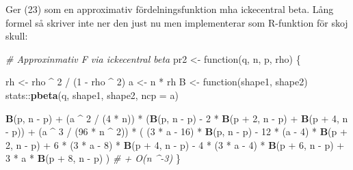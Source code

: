 \documentclass[]{article}
\newenvironment{Shaded}{\begin{snugshade}}{\end{snugshade}}
\newcommand{\KeywordTok}[1]{\textcolor[rgb]{0.13,0.29,0.53}{\textbf{{#1}}}}
\newcommand{\DataTypeTok}[1]{\textcolor[rgb]{0.13,0.29,0.53}{{#1}}}
\newcommand{\DecValTok}[1]{\textcolor[rgb]{0.00,0.00,0.81}{{#1}}}
\newcommand{\StringTok}[1]{\textcolor[rgb]{0.31,0.60,0.02}{{#1}}}
\newcommand{\CommentTok}[1]{\textcolor[rgb]{0.56,0.35,0.01}{\textit{{#1}}}}
\newcommand{\NormalTok}[1]{{#1}}
\begin{document}
Ger (23) som en approximativ fördelningsfunktion mha ickecentral beta.
Lång formel så skriver inte ner den just nu men implementerar som
R-funktion för skoj skull:

\begin{Shaded}
\begin{Highlighting}[]
\CommentTok{# Approxinmativ F via ickecentral beta}
\NormalTok{pr2 <-}\StringTok{ }\NormalTok{function(q, n, p, rho) \{}
  
  \NormalTok{rh <-}\StringTok{ }\NormalTok{rho ^}\StringTok{ }\DecValTok{2} \NormalTok{/}\StringTok{ }\NormalTok{(}\DecValTok{1} \NormalTok{-}\StringTok{ }\NormalTok{rho ^}\StringTok{ }\DecValTok{2}\NormalTok{)}
  \NormalTok{a <-}\StringTok{ }\NormalTok{n *}\StringTok{ }\NormalTok{rh}
  \NormalTok{B <-}\StringTok{ }\NormalTok{function(shape1, shape2) stats::}\KeywordTok{pbeta}\NormalTok{(q, shape1, shape2,  }\DataTypeTok{ncp =} \NormalTok{a)}
  
  \KeywordTok{B}\NormalTok{(p, n -}\StringTok{ }\NormalTok{p) +}\StringTok{ }
\StringTok{  }\NormalTok{(a ^}\StringTok{ }\DecValTok{2} \NormalTok{/}\StringTok{ }\NormalTok{(}\DecValTok{4} \NormalTok{*}\StringTok{ }\NormalTok{n))      *}\StringTok{ }\NormalTok{(}\KeywordTok{B}\NormalTok{(p, n -}\StringTok{ }\NormalTok{p) -}\StringTok{ }\DecValTok{2} \NormalTok{*}\StringTok{ }\KeywordTok{B}\NormalTok{(p +}\StringTok{ }\DecValTok{2}\NormalTok{, n -}\StringTok{ }\NormalTok{p) +}\StringTok{ }\KeywordTok{B}\NormalTok{(p +}\StringTok{ }\DecValTok{4}\NormalTok{, n -}\StringTok{ }\NormalTok{p)) +}\StringTok{ }
\StringTok{  }\NormalTok{(a ^}\StringTok{ }\DecValTok{3} \NormalTok{/}\StringTok{ }\NormalTok{(}\DecValTok{96} \NormalTok{*}\StringTok{ }\NormalTok{n ^}\StringTok{ }\DecValTok{2}\NormalTok{)) *}\StringTok{ }\NormalTok{(}
    \NormalTok{(}\DecValTok{3} \NormalTok{*}\StringTok{ }\NormalTok{a -}\StringTok{ }\DecValTok{16}\NormalTok{) *}\StringTok{ }\KeywordTok{B}\NormalTok{(p, n -}\StringTok{ }\NormalTok{p) -}\StringTok{ }\DecValTok{12} \NormalTok{*}\StringTok{ }\NormalTok{(a -}\StringTok{ }\DecValTok{4}\NormalTok{) *}\StringTok{ }\KeywordTok{B}\NormalTok{(p +}\StringTok{ }\DecValTok{2}\NormalTok{, n -}\StringTok{ }\NormalTok{p) +}
\StringTok{    }\DecValTok{6} \NormalTok{*}\StringTok{ }\NormalTok{(}\DecValTok{3} \NormalTok{*}\StringTok{ }\NormalTok{a -}\StringTok{ }\DecValTok{8}\NormalTok{) *}\StringTok{ }\KeywordTok{B}\NormalTok{(p +}\StringTok{ }\DecValTok{4}\NormalTok{, n -}\StringTok{ }\NormalTok{p) -}\StringTok{ }\DecValTok{4} \NormalTok{*}\StringTok{ }\NormalTok{(}\DecValTok{3} \NormalTok{*}\StringTok{ }\NormalTok{a -}\StringTok{ }\DecValTok{4}\NormalTok{) *}\StringTok{ }\KeywordTok{B}\NormalTok{(p +}\StringTok{ }\DecValTok{6}\NormalTok{, n -}\StringTok{ }\NormalTok{p) +}
\StringTok{    }\DecValTok{3} \NormalTok{*}\StringTok{ }\NormalTok{a *}\StringTok{ }\KeywordTok{B}\NormalTok{(p +}\StringTok{ }\DecValTok{8}\NormalTok{, n -}\StringTok{ }\NormalTok{p)}
  \NormalTok{) }\CommentTok{# + O(n ^-3)}
\NormalTok{\}}


\end{Highlighting}
\end{Shaded}
\end{document}
